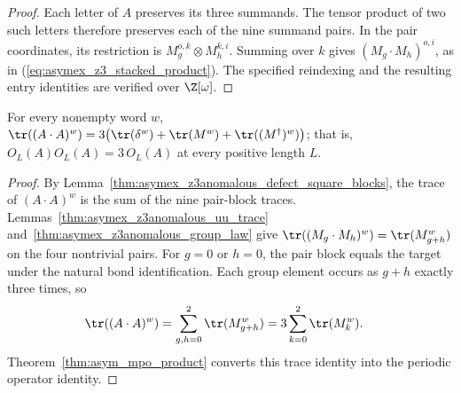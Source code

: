 \begin{proof}
    \leanok
    Each letter of $A$ preserves its three summands. The tensor product
    of two such letters therefore preserves each of the nine summand
    pairs. In the pair coordinates, its restriction is
    $M_g^{o,k}\otimes M_h^{k,i}$. Summing over $k$ gives
    $(M_g\cdot M_h)^{o,i}$, as in
    (\ref{eq:asymex_z3_stacked_product}). The specified reindexing and
    the resulting entry identities are verified over $\Z[\omega]$.
\end{proof}

\begin{lemma}
    \label{thm:asymex_z3anomalous_defect_square}
    \leanok
    For every nonempty word $w$, $\tr((A\cdot A)^w)=3\bigl(\tr(\delta^w)+\tr(M^w)+
        \tr((M^\dagger)^w)\bigr)$; that is, $O_L(A)O_L(A)=3\,O_L(A)$ at every positive length $L$.
\end{lemma}

\begin{proof}
    \leanok
    By Lemma~\ref{thm:asymex_z3anomalous_defect_square_blocks},
    the trace of $(A\cdot A)^w$ is the sum of the nine pair-block
    traces. Lemmas~\ref{thm:asymex_z3anomalous_uu_trace}
    and~\ref{thm:asymex_z3anomalous_group_law} give
    $\tr((M_g\cdot M_h)^w)=\tr(M_{g+h}^w)$ on the four nontrivial
    pairs. For $g=0$ or $h=0$, the pair block equals the target under
    the natural bond identification.
    Each group element occurs as $g+h$ exactly three times, so
    \begin{align}
        \tr((A\cdot A)^w)
         & =\sum_{g,h=0}^{2}\tr(M_{g+h}^w)
        =3\sum_{k=0}^{2}\tr(M_k^w).
    \end{align}
    Theorem~\ref{thm:asym_mpo_product} converts this trace identity into
    the periodic operator identity.
\end{proof}

